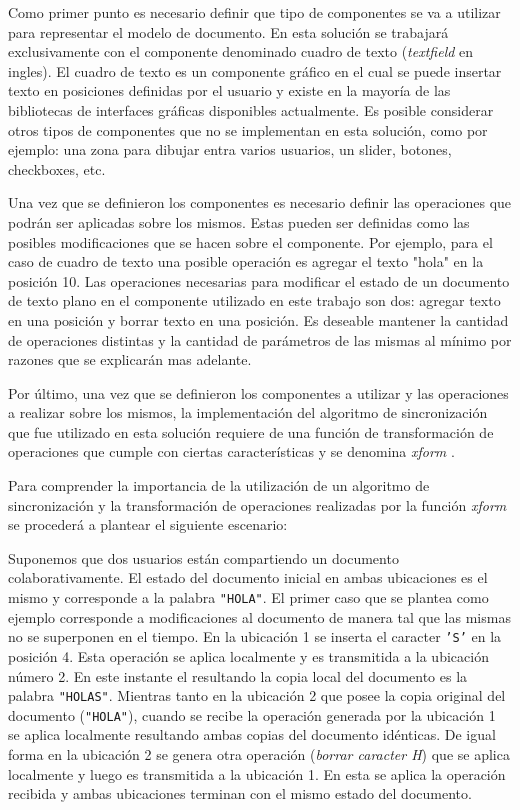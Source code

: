 \documentclass[12pt,a4paper]{article}
\begin{document}
	Como primer punto es necesario definir que tipo de componentes se va a utilizar para representar el modelo
	de documento. En esta solución se trabajará exclusivamente con el componente denominado cuadro de texto
	(\textit{textfield} en ingles). El cuadro de texto es un componente gráfico en el cual se puede insertar texto en 
	posiciones definidas por el usuario y existe en la mayoría de las bibliotecas de interfaces gráficas 
	disponibles actualmente. Es posible considerar otros tipos de componentes que no se implementan en esta
	solución, como por ejemplo: una zona para dibujar entra varios usuarios, un slider, botones, checkboxes, etc.
	
	Una vez que se definieron los componentes es necesario definir las operaciones que podrán ser aplicadas sobre
	los mismos. Estas pueden ser definidas como las posibles modificaciones que se hacen sobre el componente.
	Por ejemplo, para el caso de cuadro de texto una posible operación es agregar el texto \textsf{"hola"} 
	en la posición 10.
	Las operaciones necesarias para modificar el estado de un documento de texto plano en el componente utilizado
	en este trabajo son	dos: agregar texto en una posición y borrar texto en una posición.
	Es deseable mantener la cantidad de operaciones distintas y la cantidad de parámetros de las mismas al
	mínimo por razones que se explicarán mas adelante.

	Por último, una vez que se definieron los componentes a utilizar y las operaciones a realizar sobre los mismos,
	la implementación del algoritmo de sincronización que fue utilizado en esta solución requiere de una función 
	de transformación de operaciones que cumple con ciertas características y se denomina
	\textit{xform } \cite{jupiter}. 

	Para comprender la importancia de la utilización de un algoritmo de sincronización y la transformación
	de operaciones realizadas por la función \textit{xform }se procederá a plantear el siguiente escenario:
	
	Suponemos que dos usuarios están compartiendo un documento colaborativamente. El estado del documento 
	inicial en ambas ubicaciones es el mismo y corresponde a la palabra \texttt{"HOLA"}.
	El primer caso que se plantea como ejemplo corresponde a modificaciones al documento de manera tal 
	que las mismas no se superponen en el tiempo.
	En la ubicación 1 se inserta el caracter \texttt{'S'} en la posición 4. Esta operación se aplica localmente
	y es transmitida a la ubicación número 2. En este instante el resultando la copia local del documento es
	la palabra \texttt{"HOLAS"}.
	Mientras tanto en la ubicación 2 que posee la copia original del documento (\texttt{"HOLA"}), cuando se recibe
	la operación generada por la ubicación 1 se aplica localmente resultando ambas copias del documento idénticas.
	De igual forma en la ubicación 2 se genera otra operación (\textit{borrar caracter H}) que se aplica localmente
	y luego es transmitida a la ubicación 1. En esta se aplica la operación recibida y ambas ubicaciones terminan 
	con el mismo estado del documento.
	
\end{document}
